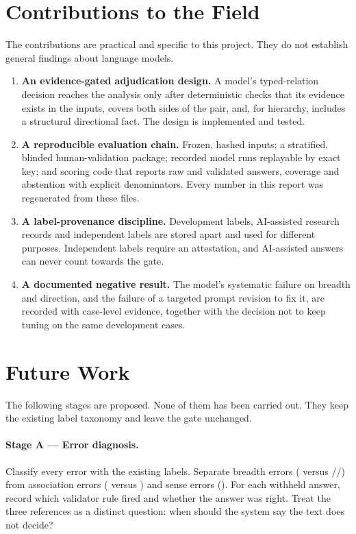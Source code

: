 \section{Contributions to the Field}
\label{sec:contributions}

The contributions are practical and specific to this project. They do not establish general findings about language models.
\begin{enumerate}
    \item \textbf{An evidence-gated adjudication design.} A model's typed-relation decision reaches the analysis only after deterministic checks that its evidence exists in the inputs, covers both sides of the pair, and, for hierarchy, includes a structural directional fact. The design is implemented and tested.
    \item \textbf{A reproducible evaluation chain.} Frozen, hashed inputs; a stratified, blinded human-validation package; recorded model runs replayable by exact key; and scoring code that reports raw and validated answers, coverage and abstention with explicit denominators. Every number in this report was regenerated from these files.
    \item \textbf{A label-provenance discipline.} Development labels, AI-assisted research records and independent labels are stored apart and used for different purposes. Independent labels require an attestation, and AI-assisted answers can never count towards the gate.
    \item \textbf{A documented negative result.} The model's systematic failure on breadth and direction, and the failure of a targeted prompt revision to fix it, are recorded with case-level evidence, together with the decision not to keep tuning on the same development cases.
\end{enumerate}

\section{Future Work}
\label{sec:future}

The following stages are proposed. None of them has been carried out. They keep the existing label taxonomy and leave the gate unchanged.

\paragraph{Stage A --- Error diagnosis.} Classify every error with the existing labels. Separate breadth errors (\SC{} versus \CH/\PA/\PO) from association errors (\RE{} versus \PO) and sense errors (\UN). For each withheld answer, record which validator rule fired and whether the answer was right. Treat the three \IE{} references as a distinct question: when should the system say the text does not decide?

